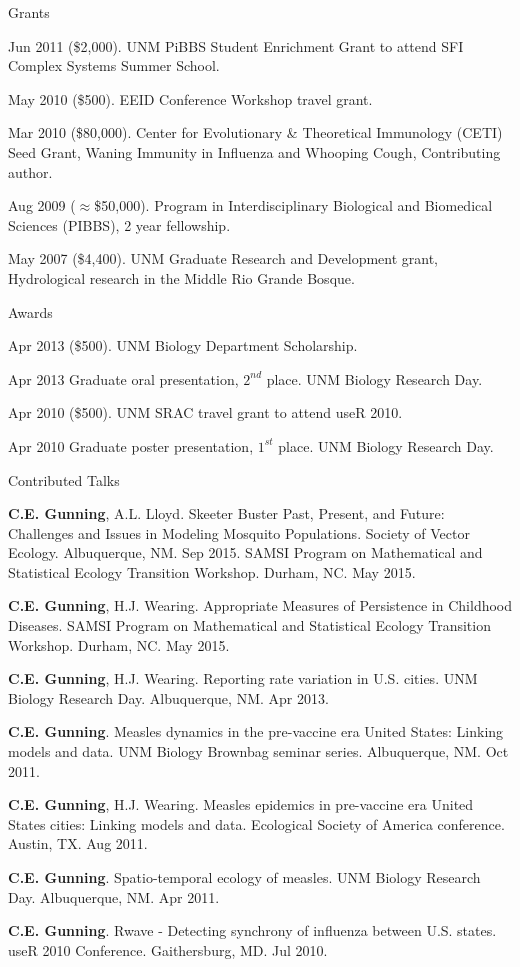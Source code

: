 \documentclass{resume} %
\begin{document}
\begin{rSection}{Grants}
\item Jun 2011 (\$2,000). UNM PiBBS Student Enrichment Grant to attend SFI Complex Systems Summer School.
\item May 2010 (\$500). EEID Conference Workshop travel grant.
\item Mar 2010 (\$80,000). Center for Evolutionary \& Theoretical Immunology (CETI) Seed
Grant, Waning Immunity in Influenza and Whooping Cough, Contributing author.
\item Aug 2009 ($\approx$\$50,000). Program in Interdisciplinary Biological and Biomedical
Sciences (PIBBS), 2 year fellowship.
\item May 2007 (\$4,400). UNM Graduate Research and Development grant, Hydrological
research in the Middle Rio Grande Bosque. 
\end{rSection}

\begin{rSection}{Awards}
\item Apr 2013 (\$500). UNM Biology Department Scholarship.
\item Apr 2013 Graduate oral presentation, $2^{nd}$ place. UNM Biology Research Day.
\item Apr 2010 (\$500). UNM SRAC travel grant to attend useR 2010.
\item Apr 2010  Graduate poster presentation, $1^{st}$ place. UNM Biology Research Day.
\end{rSection}

\begin{rSection}{Contributed Talks}
\item {\bf C.E. Gunning}, A.L. Lloyd.  Skeeter Buster Past, Present, and Future: Challenges and Issues in Modeling Mosquito Populations.
Society of Vector Ecology. Albuquerque, NM. Sep 2015.
SAMSI Program on Mathematical and Statistical Ecology Transition Workshop. Durham, NC. May 2015.
\item {\bf C.E. Gunning}, H.J. Wearing.  Appropriate Measures of Persistence in Childhood Diseases.
SAMSI Program on Mathematical and Statistical Ecology Transition Workshop. Durham, NC. May 2015.
\item {\bf C.E. Gunning}, H.J. Wearing.  Reporting rate variation in U.S. cities.
UNM Biology Research Day. Albuquerque, NM. Apr 2013.
\item {\bf C.E. Gunning}.  Measles dynamics in the pre-vaccine era United States: Linking
models and data. UNM Biology Brownbag seminar series. Albuquerque, NM. Oct 2011.
\item {\bf C.E. Gunning}, H.J. Wearing.  Measles epidemics in pre-vaccine era United States cities: Linking models and data. Ecological Society of America conference. Austin, TX. Aug 2011.
\item {\bf C.E. Gunning}.  Spatio-temporal ecology of measles. 
UNM Biology Research Day. Albuquerque, NM. Apr 2011.
\item {\bf C.E. Gunning}. Rwave - Detecting synchrony of influenza between U.S. states.
useR 2010 Conference. Gaithersburg, MD. Jul 2010.
\end{rSection}
\end{document}
